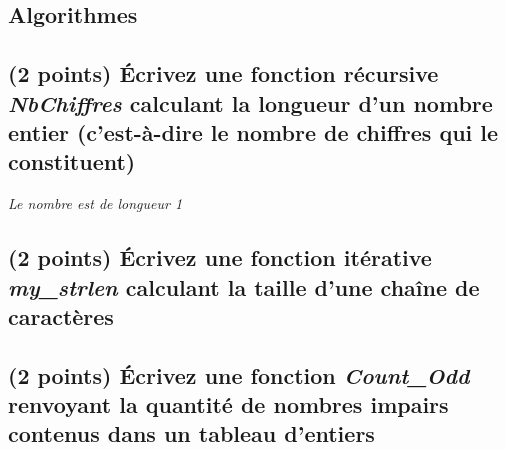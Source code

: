 \documentclass[11pt,a4paper]{article}
\begin{document}

\clearpage


\subsection*{Algorithmes}

\subsection{(2 points) \'Ecrivez une fonction récursive \og \textit{NbChiffres} \fg{} calculant la longueur d'un nombre entier (c'est-à-dire le nombre de chiffres qui le constituent) }

\centerline{\textit{Le nombre  \fg{} est de longueur 1}}

\medskip

\begin{center}
\end{center}




\subsection{(2 points) \'Ecrivez une fonction itérative \og \textit{my\_strlen} \fg{} calculant la taille d'une chaîne de caractères }

\medskip

\begin{center}
\end{center}


\clearpage


\subsection{(2 points) \'Ecrivez une fonction \og \textit{Count\_Odd} \fg{} renvoyant la quantité de nombres impairs contenus dans un tableau d'entiers }

\medskip

\begin{center}
\end{center}




\end{document}
